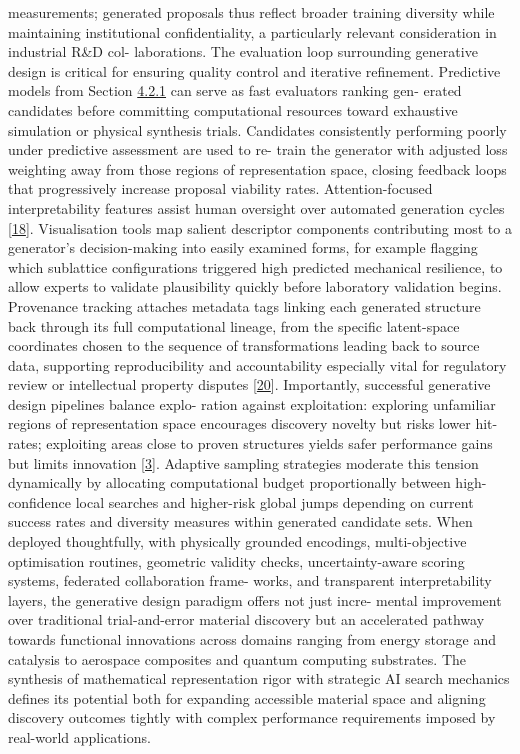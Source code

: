 \documentclass[
]{article}
\begin{document}
measurements; generated proposals thus reflect broader training
diversity while maintaining institutional confidentiality, a
particularly relevant consideration in industrial R\&D col- laborations.
The evaluation loop surrounding generative design is critical for
ensuring quality control and iterative refinement. Predictive models
from Section
\protect\hyperlink{predictive-modelling-of-material-performance}{4.2.1}
can serve as fast evaluators ranking gen- erated candidates before
committing computational resources toward exhaustive simulation or
physical synthesis trials. Candidates consistently performing poorly
under predictive assessment are used to re- train the generator with
adjusted loss weighting away from those regions of representation space,
closing feedback loops that progressively increase proposal viability
rates. Attention-focused interpretability features assist human
oversight over automated generation cycles
{[}\protect\hyperlink{_bookmark58}{18}{]}. Visualisation tools map
salient descriptor components contributing most to a generator's
decision-making into easily examined forms, for example flagging which
sublattice configurations triggered high predicted mechanical
resilience, to allow experts to validate plausibility quickly before
laboratory validation begins. Provenance tracking attaches metadata tags
linking each generated structure back through its full computational
lineage, from the specific latent-space coordinates chosen to the
sequence of transformations leading back to source data, supporting
reproducibility and accountability especially vital for regulatory
review or intellectual property disputes
{[}\protect\hyperlink{_bookmark60}{20}{]}. Importantly, successful
generative design pipelines balance explo- ration against exploitation:
exploring unfamiliar regions of representation space encourages
discovery novelty but risks lower hit-rates; exploiting areas close to
proven structures yields safer performance gains but limits innovation
{[}\protect\hyperlink{_bookmark43}{3}{]}. Adaptive sampling strategies
moderate this tension dynamically by allocating computational budget
proportionally between high-confidence local searches and higher-risk
global jumps depending on current success rates and diversity measures
within generated candidate sets. When deployed thoughtfully, with
physically grounded encodings, multi-objective optimisation routines,
geometric validity checks, uncertainty-aware scoring systems, federated
collaboration frame- works, and transparent interpretability layers, the
generative design paradigm offers not just incre- mental improvement
over traditional trial-and-error material discovery but an accelerated
pathway towards functional innovations across domains ranging from
energy storage and catalysis to aerospace composites and quantum
computing substrates. The synthesis of mathematical representation rigor
with strategic AI search mechanics defines its potential both for
expanding accessible material space and aligning discovery outcomes
tightly with complex performance requirements imposed by real-world
applications.
\end{document}
